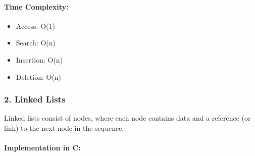 \hypertarget{time-complexity}{%
\paragraph{Time Complexity:}\label{time-complexity}}

\begin{itemize}
\tightlist
\item
  Access: O(1)
\item
  Search: O(n)
\item
  Insertion: O(n)
\item
  Deletion: O(n)
\end{itemize}

\hypertarget{linked-lists}{%
\subsubsection{2. Linked Lists}\label{linked-lists}}

Linked lists consist of nodes, where each node contains data and a
reference (or link) to the next node in the sequence.

\hypertarget{implementation-in-c}{%
\paragraph{Implementation in C:}\label{implementation-in-c}}

